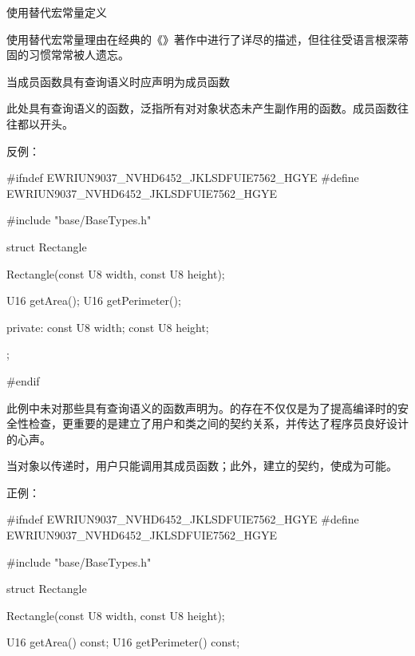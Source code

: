 \begin{content}

\begin{regulation}
使用替代宏常量定义
\end{regulation}

使用替代宏常量理由在经典的《》著作中进行了详尽的描述，但往往受\clang{}语言根深蒂固的习惯常常被人遗忘。

\begin{regulation}
当成员函数具有查询语义时应声明为成员函数
\end{regulation}

此处具有查询语义的函数，泛指所有对对象状态未产生副作用的函数。成员函数往往都以开头。

反例：
\begin{leftbar}
\begin{c++}[caption={math/Rectangle.h}]
#ifndef EWRIUN9037_NVHD6452_JKLSDFUIE7562_HGYE
#define EWRIUN9037_NVHD6452_JKLSDFUIE7562_HGYE

#include "base/BaseTypes.h"

struct Rectangle
{
    Rectangle(const U8 width, const U8 height);

    U16 getArea();
    U16 getPerimeter();

private:
    const U8 width;
    const U8 height;
};

#endif
\end{c++}
\end{leftbar}

此例中未对那些具有查询语义的函数声明为。的存在不仅仅是为了提高编译时的安全性检查，更重要的是建立了用户和类之间的契约关系，并传达了程序员良好设计的心声。

当对象以传递时，用户只能调用其成员函数；此外，建立的契约，使成为可能。

正例：
\begin{leftbar}
\begin{c++}[caption={math/Rectangle.h}]
#ifndef EWRIUN9037_NVHD6452_JKLSDFUIE7562_HGYE
#define EWRIUN9037_NVHD6452_JKLSDFUIE7562_HGYE

#include "base/BaseTypes.h"

struct Rectangle
{
    Rectangle(const U8 width, const U8 height);

    U16 getArea() const;
    U16 getPerimeter() const;

}
\end{c++}
\end{leftbar}
\end{content}
